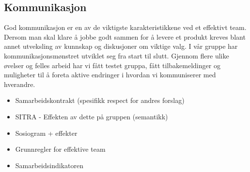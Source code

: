 \subsection{Kommunikasjon}


God kommunikasjon er en av de viktigste karakteristikkene ved et effektivt team.
Dersom man skal klare å jobbe godt sammen for å levere et produkt kreves blant annet utveksling av kunnskap og diskusjoner om viktige valg.
I vår gruppe har kommunikasjonsmønstret utviklet seg fra start til slutt.
Gjennom flere ulike øvelser og felles arbeid har vi fått testet gruppa, fått tilbakemeldinger og muligheter til å foreta aktive endringer i hvordan vi kommuniserer med hverandre.

\begin{itemize}
\item Samarbeidskontrakt (spesifikk respect for andres forslag)
\item SITRA - Effekten av dette på gruppen (semantikk)
\item Sosiogram + effekter
\item Grunnregler for effektive team
\item Samarbeidsindikatoren
\end{itemize}


%
%



